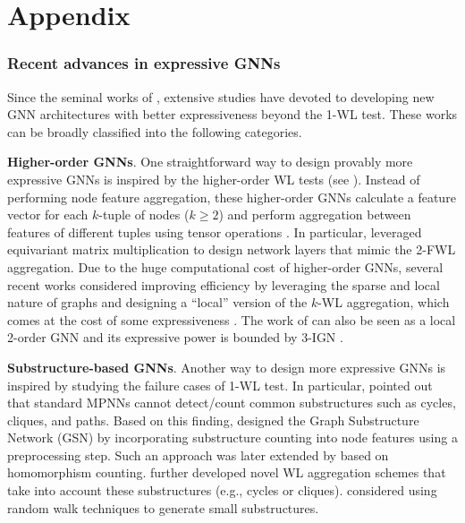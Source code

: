 \documentclass{article} %
\let\cref\crtcref
\begin{document}
\part{Appendix} %
\setcounter{secnumdepth}{4}
\setcounter{tocdepth}{4}
\parttoc %
\newpage

\section{Recent advances in expressive GNNs}
\label{sec:related_work_expressive_gnn}
\vspace{-2pt}
Since the seminal works of \citet{xu2019powerful,morris2019weisfeiler}, extensive studies have devoted to developing new GNN architectures with better expressiveness beyond the 1-WL test. These works can be broadly classified into the following categories.

\textbf{Higher-order GNNs}. One straightforward way to design provably more expressive GNNs is inspired by the higher-order WL tests (see \cref{sec:kfwl}). Instead of performing node feature aggregation, these higher-order GNNs calculate a feature vector for each $k$-tuple of nodes ($k\ge 2$) and perform aggregation between features of different tuples using tensor operations \citep{morris2019weisfeiler,maron2019invariant,maron2019universality,maron2019provably,keriven2019universal,azizian2021expressive,geerts2022expressiveness}. In particular, \citet{maron2019provably} leveraged equivariant matrix multiplication to design network layers that mimic the 2-FWL aggregation. Due to the huge computational cost of higher-order GNNs, several recent works considered improving efficiency by leveraging the sparse and local nature of graphs and designing a ``local'' version of the $k$-WL aggregation, which comes at the cost of some expressiveness \citep{morris2020weisfeiler,morris2022speqnets}. The work of \citet{vignac2020building} can also be seen as a local 2-order GNN and its expressive power is bounded by 3-IGN \citep{maron2019universality}.

\textbf{Substructure-based GNNs}. Another way to design more expressive GNNs is inspired by studying the failure cases of 1-WL test. In particular, \citet{chen2020can} pointed out that standard MPNNs cannot detect/count common substructures such as cycles, cliques, and paths. Based on this finding, \citet{bouritsas2022improving} designed the Graph Substructure Network (GSN) by incorporating substructure counting into node features using a preprocessing step. Such an approach was later extended by \citet{barcelo2021graph} based on homomorphism counting. \citet{bodnar2021topological,bodnar2021cellular,thiede2021autobahn,horn2022topological} further developed novel WL aggregation schemes that take into account these substructures (e.g., cycles or cliques). \citet{toenshoff2021graph} considered using random walk techniques to generate small substructures.
\end{document}
